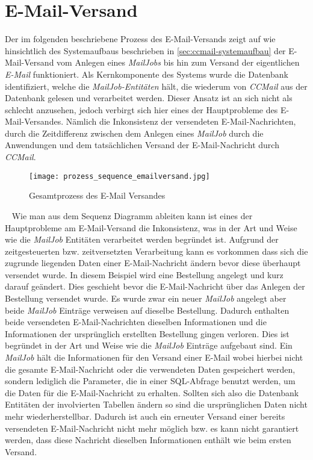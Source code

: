 \section{E-Mail-Versand}
\label{sec:ccmail-email-versand}
Der im folgenden beschriebene Prozess des E-Mail-Versands zeigt auf wie hinsichtlich des Systemaufbaus beschrieben in \ref{sec:ccmail-systemaufbau} der E-Mail-Versand vom Anlegen eines \emph{MailJobs} bis hin zum Versand der eigentlichen \emph{E-Mail} funktioniert. 
\newline
\newline
Als Kernkomponente des Systems wurde die Datenbank identifiziert, welche die \emph{MailJob-Entitäten} hält, die wiederum von \emph{CCMail} aus der Datenbank gelesen und verarbeitet werden. Dieser Ansatz ist an sich nicht als schlecht anzusehen, jedoch verbirgt sich hier eines der Hauptprobleme des E-Mail-Versandes. Nämlich die Inkonsistenz der versendeten E-Mail-Nachrichten, durch die Zeitdifferenz zwischen dem Anlegen eines \emph{MailJob} durch die Anwendungen und dem tatsächlichen Versand der E-Mail-Nachricht durch \emph{CCMail}.
\begin{figure}[h]
\centering
\texttt{[image: prozess\_sequence\_emailversand.jpg]}
\caption{Gesamtprozess des E-Mail Versandes}
\label{fig:sequence-diagramm-gesamtprozess}
\end{figure}
\ \newline
Wie man aus dem Sequenz Diagramm ableiten kann ist eines der Hauptprobleme am E-Mail-Versand die Inkonsistenz, was in der Art und Weise wie die \emph{MailJob} Entitäten verarbeitet werden begründet ist. Aufgrund der zeitgesteuerten bzw. zeitversetzten Verarbeitung kann es vorkommen dass sich die zugrunde liegenden Daten einer E-Mail-Nachricht ändern bevor diese überhaupt versendet wurde. In diesem Beispiel wird eine Bestellung angelegt und kurz darauf geändert. Dies geschieht bevor die E-Mail-Nachricht über das Anlegen der Bestellung versendet wurde. Es wurde zwar ein neuer \emph{MailJob} angelegt aber beide \emph{MailJob} Einträge verweisen auf dieselbe Bestellung. Dadurch enthalten beide versendeten E-Mail-Nachrichten dieselben Informationen und die Informationen der ursprünglich erstellten Bestellung gingen verloren. 
\newline
\newline
Dies ist begründet in der Art und Weise wie die \emph{MailJob} Einträge aufgebaut sind. Ein \emph{MailJob} hält die Informationen für den Versand einer E-Mail wobei hierbei nicht die gesamte E-Mail-Nachricht oder die verwendeten Daten gespeichert werden, sondern lediglich die Parameter, die in einer SQL-Abfrage benutzt werden, um die Daten für die E-Mail-Nachricht zu erhalten. Sollten sich also die Datenbank Entitäten der involvierten Tabellen ändern so sind die ursprünglichen Daten nicht mehr wiederherstellbar. Dadurch ist auch ein erneuter Versand einer bereits versendeten E-Mail-Nachricht nicht mehr möglich bzw. es kann nicht garantiert werden, dass diese Nachricht dieselben Informationen enthält wie beim ersten Versand.
